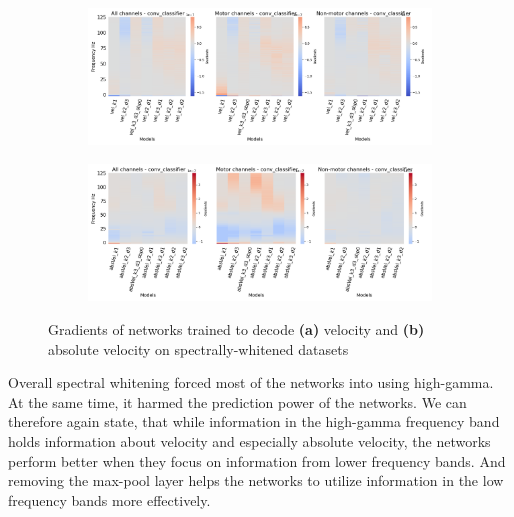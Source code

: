 \begin{figure}[!htbp]
\begin{subfigure}[a]{\textwidth}
   \includegraphics[width=1\linewidth]{img/ch4/vel-pw-last-layer-grads}
   \caption{}
   \label{fig:vel-pw-last-layer-grads}
\end{subfigure}

\begin{subfigure}[b]{\textwidth}
   \includegraphics[width=1\linewidth]{img/ch4/absVel-pw-last-layer-grads}
   \caption{}
   \label{fig:absVel-pw-last-layet-grads}
\end{subfigure}
\caption[Spectral whitening - gradients]{Gradients of networks trained to decode \textbf{(a)} velocity and \textbf{(b)} absolute velocity on spectrally-whitened datasets}
\label{fig:pw-last-layer-grads}
\end{figure}

Overall spectral whitening forced most of the networks into using high-gamma. 
At the same time, it harmed the prediction power of the networks.
We can therefore again state, that while information in the high-gamma frequency band holds information about velocity and especially absolute velocity, the networks perform better when they focus on information from lower frequency bands. 
And removing the max-pool layer helps the networks to utilize information in the low frequency bands more effectively.


